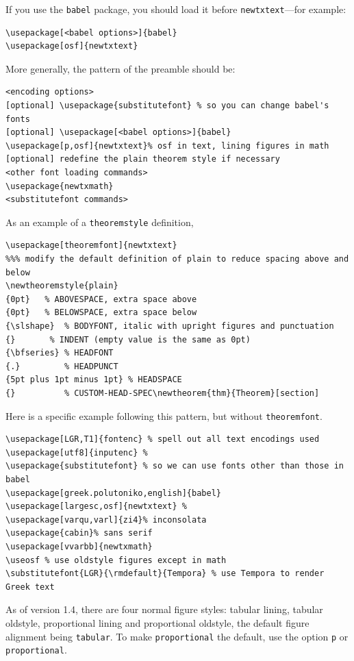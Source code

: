 \documentclass[11pt]{article}
\theoremstyle{oldplain}
\theoremstyle{plain}
\begin{document}
If you use the {\tt babel} package, you should load it before {\tt newtxtext}---for example:
\begin{verbatim}
\usepackage[<babel options>]{babel}
\usepackage[osf]{newtxtext}
\end{verbatim}
More generally, the pattern of the preamble should be:
\begin{verbatim}
<encoding options>
[optional] \usepackage{substitutefont} % so you can change babel's fonts
[optional] \usepackage[<babel options>]{babel}
\usepackage[p,osf]{newtxtext}% osf in text, lining figures in math
[optional] redefine the plain theorem style if necessary
<other font loading commands>
\usepackage{newtxmath}
<substitutefont commands>
\end{verbatim}
As an example of a {\tt theoremstyle} definition,
\begin{verbatim}
\usepackage[theoremfont]{newtxtext}
%%% modify the default definition of plain to reduce spacing above and below
\newtheoremstyle{plain}
{0pt}   % ABOVESPACE, extra space above
{0pt}   % BELOWSPACE, extra space below
{\slshape}  % BODYFONT, italic with upright figures and punctuation
{}       % INDENT (empty value is the same as 0pt)
{\bfseries} % HEADFONT
{.}         % HEADPUNCT
{5pt plus 1pt minus 1pt} % HEADSPACE
{}          % CUSTOM-HEAD-SPEC\newtheorem{thm}{Theorem}[section]
\end{verbatim}

Here is a specific example following this pattern, but without {\tt theoremfont}.
\begin{verbatim}
\usepackage[LGR,T1]{fontenc} % spell out all text encodings used
\usepackage[utf8]{inputenc} % 
\usepackage{substitutefont} % so we can use fonts other than those in babel
\usepackage[greek.polutoniko,english]{babel}
\usepackage[largesc,osf]{newtxtext} % 
\usepackage[varqu,varl]{zi4}% inconsolata
\usepackage{cabin}% sans serif
\usepackage[vvarbb]{newtxmath}
\useosf % use oldstyle figures except in math
\substitutefont{LGR}{\rmdefault}{Tempora} % use Tempora to render Greek text
\end{verbatim}

As of version 1.4, there are four normal figure styles: tabular lining, tabular oldstyle, proportional lining and proportional oldstyle, the default figure alignment being \texttt{tabular}. To make \texttt{proportional} the default, use the option \texttt{p} or \texttt{proportional}.
\end{document}
